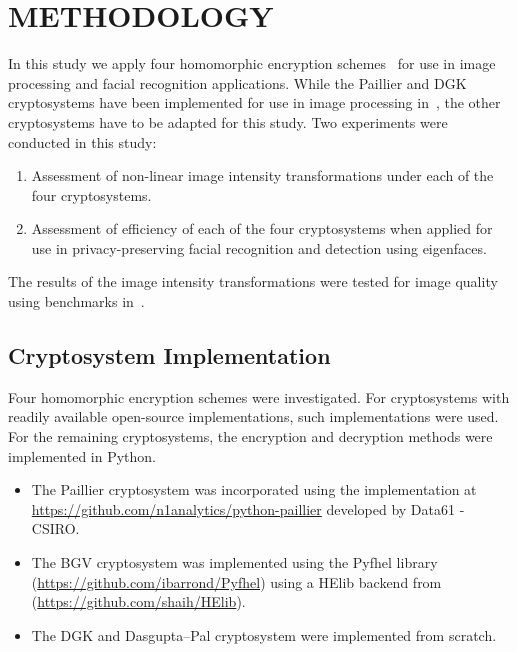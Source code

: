\chapter{METHODOLOGY}

In this study we apply four homomorphic encryption schemes~\cite{ziad_cryptoimg:_2016, pieprzyk_efficient_2007, dasgupta_design_2016, garay_algorithms_2014} for use in image processing and facial recognition applications.
While the Paillier and DGK cryptosystems have been implemented for use in image processing in~\cite{ziad_cryptoimg:_2016, hutchison_privacy-preserving_2009}, the other cryptosystems have to be adapted for this study.
Two experiments were conducted in this study:
\begin{enumerate}
	\item Assessment of non-linear image intensity transformations under each of the four cryptosystems.
	\item Assessment of efficiency of each of the four cryptosystems when applied for use in privacy-preserving facial recognition and detection using eigenfaces.
\end{enumerate}
The results of the image intensity transformations were tested for image quality using benchmarks in~\cite{ahmed_benchmark_2016}.

\section{Cryptosystem Implementation}


Four homomorphic encryption schemes were investigated. For cryptosystems with readily available open-source implementations, such implementations were used. For the remaining cryptosystems, the encryption and decryption methods were implemented in Python.
\begin{itemize}
	\item The Paillier cryptosystem was incorporated using the implementation at \url{https://github.com/n1analytics/python-paillier} developed by Data61 - CSIRO.
	\item The BGV cryptosystem was implemented using the Pyfhel library (\url{https://github.com/ibarrond/Pyfhel}) using a HElib backend from (\url{https://github.com/shaih/HElib}).
	\item The DGK and Dasgupta--Pal cryptosystem were implemented from scratch.
\end{itemize}

